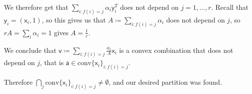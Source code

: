 \documentclass[kulak]{tplt}
\theoremstyle{definition}
\newcommand{\vv}{\mathsf{v}}
\newcommand{\vx}{\mathsf{x}}
\newcommand{\vy}{\mathsf{y}}
\newcommand{\va}{\mathsf{a}}
\newcommand{\conv}{\mathrm{conv}}
\begin{document}
\begin{enumerate}
We therefore get that $ \sum_{i: f(i) = j} \alpha_i \vy_i^T$ does not depend on $j = 1, \ldots, r$.
Recall that $\vy_i = (\vx_i, 1)$, so this gives us that $A \coloneqq  \sum_{i: f(i) = j} \alpha_i$ does not depend on $j$, so $r A = \sum_i \alpha_i = 1$ gives $A = \frac{1}{r}$.

We conclude that $\vv \coloneqq \sum_{i: f(i) = j} \frac{\alpha_i}{A}\vx_i$ is a convex combination that does not depend on $j$, that is $\va \in \conv\{\vx_i\}_{i: f(i) = j}$.

Therefore $\bigcap_j \conv\{\vx_i\}_{i: f(i) = j}\neq \emptyset$, and our desired partition was found.



\end{enumerate}
\end{document}
